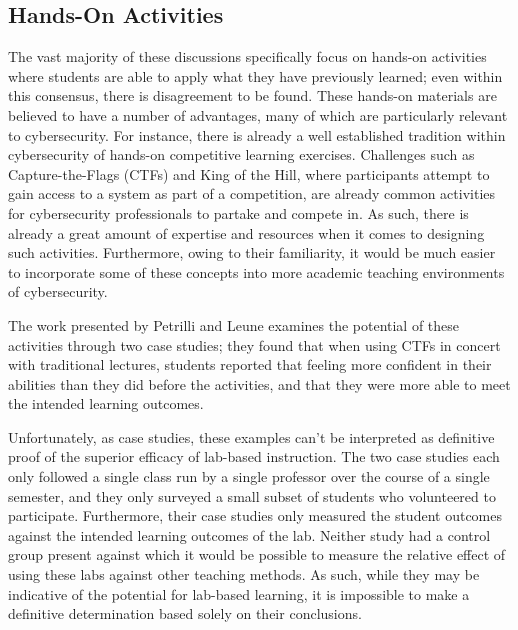 \subsection{Hands-On Activities}

    The vast majority of these discussions specifically focus on hands-on activities where students are able to apply what they have previously learned; %
even within this consensus, there is disagreement to be found. %
These hands-on materials are believed to have a number of advantages, many of which are particularly relevant to cybersecurity. %
For instance, there is already a well established tradition within cybersecurity of hands-on competitive learning exercises. %
Challenges such as Capture-the-Flags (CTFs) and King of the Hill, where participants attempt to gain access to a system as part of a competition, are already common activities for cybersecurity professionals to partake and compete in. %
As such, there is already a great amount of expertise and resources when it comes to designing such activities. %
Furthermore, owing to their familiarity, it would be much easier to incorporate some of these concepts into more academic teaching environments of cybersecurity.

    The work presented by Petrilli and Leune examines the potential of these activities through two case studies; %
they found that when using CTFs in concert with traditional lectures, students reported that feeling more confident in their abilities than they did before the activities, and that they were more able to meet the intended learning outcomes. 

    Unfortunately, as case studies, these examples can't be interpreted as definitive proof of the superior efficacy of lab-based instruction. 
    The two case studies each only followed a single class run by a single professor over the course of a single semester, and they only surveyed a small subset of students who volunteered to participate. %
Furthermore, their case studies only measured the student outcomes against the intended learning outcomes of the lab. %
Neither study had a control group present against which it would be possible to measure the relative effect of using these labs against other teaching methods. %
As such, while they may be indicative of the potential for lab-based learning, it is impossible to make a definitive determination based solely on their conclusions.

